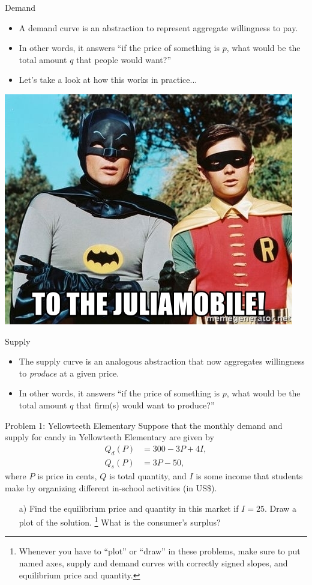 \documentclass[10pt]{beamer}
\begin{document}
\begin{frame}{Demand}
    \begin{itemize}
        \item A demand curve is an abstraction to represent aggregate willingness to pay.
        \item In other words, it answers ``if the price of something is \(p\), what would be the total amount \(q\) that people would want?''
        \pause
        \item Let's take a look at how this works in practice...
    \end{itemize}
    \begin{center}
        \includegraphics[width=.5\textwidth]{to-the-juliamobile.jpg}
    \end{center}
\end{frame}

\begin{frame}{Supply}
    \begin{itemize}
        \item The supply curve is an analogous abstraction that now aggregates willingness to \emph{produce} at a given price.
        \item In other words, it answers ``if the price of something is \(p\), what would be the total amount \(q\) that firm(s) would want to produce?''
    \end{itemize}
\end{frame}

\begin{frame}[t]{Problem 1: Yellowteeth Elementary}
    Suppose that the monthly demand and supply for candy in Yellowteeth Elementary are given by
    \begin{align*}
        Q_d(P) &= 300 - 3P + 4I, \\
        Q_s(P) &= 3P - 50,
    \end{align*}
    where \(P\) is price in cents, \(Q\) is total quantity, and \(I\) is some income that students make by organizing different in-school activities (in US\$).
    \begin{enumerate}
        \item[a)] Find the equilibrium price and quantity in this market if \(I = 25\). Draw a plot of the solution.%
        \footnote{Whenever you have to ``plot'' or ``draw'' in these problems, make sure to put named axes, supply and demand curves with correctly signed slopes, and equilibrium price and quantity.}
        What is the consumer's surplus?
    \end{enumerate}
\end{frame}
\end{document}
